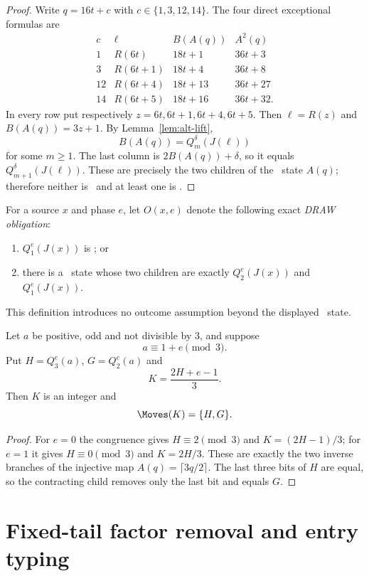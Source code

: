 \begin{proof}
Write $q=16t+c$ with $c\in\{1,3,12,14\}$. The four direct exceptional
formulas are
\[
\begin{array}{c|c|c|c}
c&\ell&B(A(q))&A^2(q)\\ \hline
1&R(6t)&18t+1&36t+3\\
3&R(6t+1)&18t+4&36t+8\\
12&R(6t+4)&18t+13&36t+27\\
14&R(6t+5)&18t+16&36t+32.
\end{array}
\]
In every row put respectively $z=6t,6t+1,6t+4,6t+5$. Then
$\ell=R(z)$ and $B(A(q))=3z+1$. By Lemma~\ref{lem:alt-lift},
\[
  B(A(q))=Q_m^\delta(J(\ell))
\]
for some $m\ge1$. The last column is $2B(A(q))+\delta$, so it equals
$Q_{m+1}^\delta(J(\ell))$. These are precisely the two children of the
\DRAW\ state $A(q)$; therefore neither is \LOSS\ and at least one is \DRAW.
\end{proof}

For a source $x$ and phase $e$, let $O(x,e)$ denote the following exact
\emph{DRAW obligation}:
\begin{enumerate}[label=(\alph*)]
\item $Q_1^e(J(x))$ is \DRAW; or
\item there is a \DRAW\ state whose two children are exactly
      $Q_2^e(J(x))$ and $Q_1^e(J(x))$.
\end{enumerate}
This definition introduces no outcome assumption beyond the displayed
\DRAW\ state.

\begin{lemma}\label{lem:hidden-parent}
Let $a$ be positive, odd and not divisible by $3$, and suppose
\[
  a\equiv1+e\pmod3.
\]
Put $H=Q_3^e(a)$, $G=Q_2^e(a)$ and
\[
  K=\frac{2H+e-1}{3}.
\]
Then $K$ is an integer and
\[
  \Moves(K)=\{H,G\}.
\]
\end{lemma}

\begin{proof}
For $e=0$ the congruence gives $H\equiv2\pmod3$ and
$K=(2H-1)/3$; for $e=1$ it gives $H\equiv0\pmod3$ and $K=2H/3$.
These are exactly the two inverse branches of the injective map
$A(q)=\lceil3q/2\rceil$. The last three bits of $H$ are equal, so the
contracting child removes only the last bit and equals $G$.
\end{proof}

\section{Fixed-tail factor removal and entry typing}

